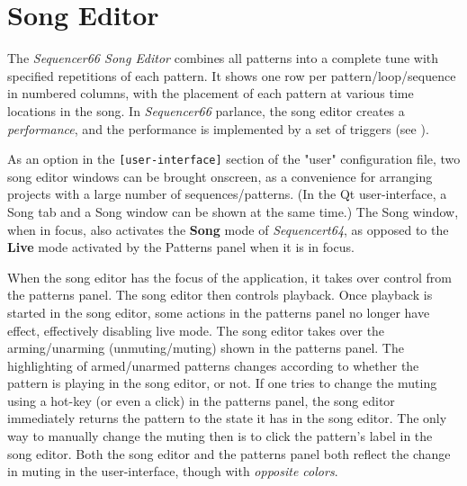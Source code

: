 %
%
%

\section{Song Editor}
\label{sec:seq66_song_editor}

   The \textsl{Sequencer66 Song Editor} combines all patterns
   into a complete tune with specified repetitions of each pattern.
   It shows one row per pattern/loop/sequence in numbered columns,
   with the placement of each pattern at various time locations in the song.
   In \textsl{Sequencer66} parlance, the song editor creates a
   \textsl{performance}, and the performance is implemented by a set of
   triggers (see ).

   As an option in the \texttt{[user-interface]}
   section of the "user" configuration file, two song editor windows can be
   brought onscreen, as a convenience for arranging projects with a large
   number of sequences/patterns.
   (In the Qt user-interface, a Song tab and a Song window can be shown at the
   same time.)
   The Song window, when in focus, also activates
   the \textbf{Song} mode of \textsl{Sequencert64},
   as opposed to the \textbf{Live} mode activated by the Patterns panel when it
   is in focus.

   When the song editor has the focus of the application, it
   takes over control from the patterns panel.  The song editor then
   controls playback.
   Once playback is started in the song editor, some actions
   in the patterns panel no longer have effect, effectively disabling live
   mode.  The song editor takes over the arming/unarming (unmuting/muting)
   shown in the patterns panel.  The highlighting of armed/unarmed patterns
   changes according to whether the pattern is playing in the song editor, or
   not.  If one tries to change the muting using a hot-key (or even a click) in
   the patterns panel, the song editor immediately returns the pattern to the
   state it has in the song editor.  The only way to manually change the muting
   then is to click the pattern's label in the song editor.
   Both the song editor and the patterns panel both reflect the change in
   muting in the user-interface, though with \textsl{opposite colors}.


